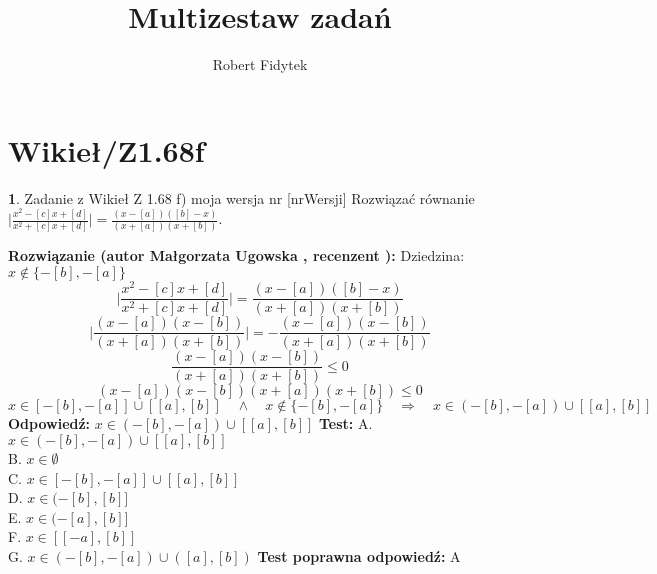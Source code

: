 \documentclass[12pt, a4paper]{article}
\title{Multizestaw zadań}
\author{Robert Fidytek}
\date{}
\theoremstyle{definition} %
\newtheorem{zad}{}
\newcommand{\kategoria}[1]{\section{#1}} %
\newcommand{\zadStart}[1]{\begin{zad}#1\newline} %
\newcommand{\zadStop}{\end{zad}}   %
\newcommand{\rozwStart}[2]{\noindent \textbf{Rozwiązanie (autor #1 , recenzent #2): }\newline} %
\newcommand{\rozwStop}{\newline}                                            %
\newcommand{\odpStart}{\noindent \textbf{Odpowiedź:}\newline}    %
\newcommand{\odpStop}{\newline}                                             %
\newcommand{\testStart}{\noindent \textbf{Test:}\newline} %
\newcommand{\testStop}{\newline} %
\newcommand{\kluczStart}{\noindent \textbf{Test poprawna odpowiedź:}\newline} %
\newcommand{\kluczStop}{\newline} %
\begin{document}
\maketitle


\kategoria{Wikieł/Z1.68f}
\zadStart{Zadanie z Wikieł Z 1.68 f) moja wersja nr [nrWersji]}
Rozwiązać równanie $\Big| \frac{x^2-[c]x+[d]}{x^2+[c]x+[d]} \Big| = \frac{(x-[a])([b]-x)}{(x+[a])(x+[b])}$.
\zadStop
\rozwStart{Małgorzata Ugowska}{}
Dziedzina: $ x \notin\{ -[b], -[a]\}$
$$\Big| \frac{x^2-[c]x+[d]}{x^2+[c]x+[d]} \Big| = \frac{(x-[a])([b]-x)}{(x+[a])(x+[b])}$$
$$\Big| \frac{(x-[a])(x-[b])}{(x+[a])(x+[b])}\Big| = - \frac{(x-[a])(x-[b])}{(x+[a])(x+[b])}$$
$$\frac{(x-[a])(x-[b])}{(x+[a])(x+[b])} \le 0$$
$$(x-[a])(x-[b])(x+[a])(x+[b]) \le 0$$
$$x \in [-[b],-[a]] \cup [[a], [b]] \quad \land \quad x \notin\{ -[b], -[a]\} \quad \Longrightarrow \quad x \in (-[b],-[a]) \cup [[a], [b]] $$
\rozwStop
\odpStart
$x \in (-[b],-[a]) \cup [[a], [b]]$
\odpStop
\testStart
A. $x \in (-[b],-[a]) \cup [[a], [b]]$\\
B. $x \in \emptyset $\\
C. $x \in [-[b],-[a]] \cup [[a], [b]]$\\
D. $x \in (-[b], [b]]$\\
E. $x \in (-[a], [b]]$\\
F. $x \in [[-a], [b]]$\\
G. $x \in (-[b],-[a]) \cup ([a], [b])$
\testStop
\kluczStart
A
\kluczStop
\end{document}
